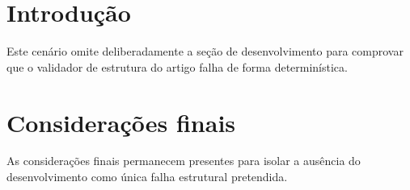 \documentclass{abntexto-ufc}
\begin{document}

\section{Introdução}

Este cenário omite deliberadamente a seção de desenvolvimento para comprovar que o validador de estrutura do artigo falha de forma determinística.

\section{Considerações finais}

As considerações finais permanecem presentes para isolar a ausência do desenvolvimento como única falha estrutural pretendida.

\nocite{silva2020}
\ufcPrintReferences
\end{document}

